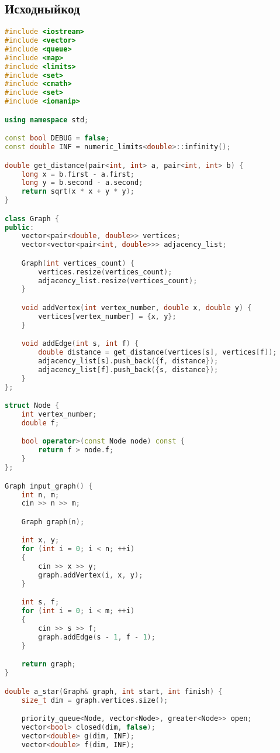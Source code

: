 \documentclass[12pt]{article}
\begin{document}
\subsection*{Исходныйкод}
\begin{lstlisting}[language=C++, basicstyle=\ttfamily\footnotesize, breaklines=true]
#include <iostream>
#include <vector>
#include <queue>
#include <map>
#include <limits>
#include <set>
#include <cmath>
#include <set>
#include <iomanip>

using namespace std;

const bool DEBUG = false;
const double INF = numeric_limits<double>::infinity();

double get_distance(pair<int, int> a, pair<int, int> b) {
    long x = b.first - a.first;
    long y = b.second - a.second;
    return sqrt(x * x + y * y);
}

class Graph {
public:
    vector<pair<double, double>> vertices;
    vector<vector<pair<int, double>>> adjacency_list;

    Graph(int vertices_count) {
        vertices.resize(vertices_count);
        adjacency_list.resize(vertices_count);
    }

    void addVertex(int vertex_number, double x, double y) {
        vertices[vertex_number] = {x, y};
    }

    void addEdge(int s, int f) {
        double distance = get_distance(vertices[s], vertices[f]);
        adjacency_list[s].push_back({f, distance});
        adjacency_list[f].push_back({s, distance});
    }
};

struct Node {
    int vertex_number;
    double f;

    bool operator>(const Node node) const {
        return f > node.f;
    }
};

Graph input_graph() {
    int n, m;
    cin >> n >> m;

    Graph graph(n);

    int x, y;
    for (int i = 0; i < n; ++i)
    {
        cin >> x >> y;
        graph.addVertex(i, x, y);
    }

    int s, f;
    for (int i = 0; i < m; ++i)
    {
        cin >> s >> f;
        graph.addEdge(s - 1, f - 1);
    }

    return graph;
}

double a_star(Graph& graph, int start, int finish) {
    size_t dim = graph.vertices.size();

    priority_queue<Node, vector<Node>, greater<Node>> open;
    vector<bool> closed(dim, false);
    vector<double> g(dim, INF);
    vector<double> f(dim, INF);


\end{lstlisting}
\end{document}
